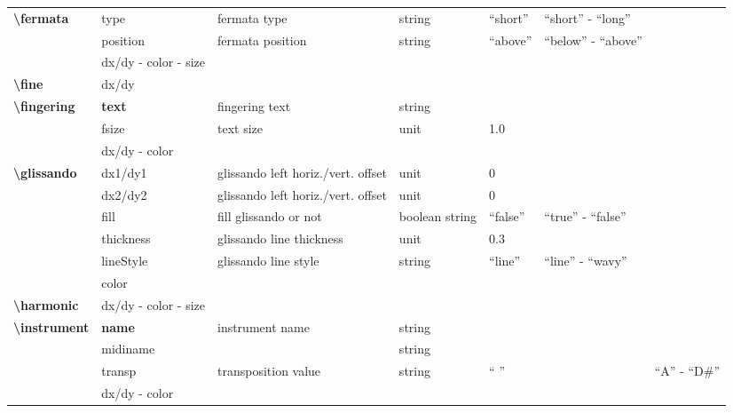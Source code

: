 \documentclass[a4paper, landscape, 10pt]{article}
\begin{document}
\begin{tabularx}{\linewidth}{p{3cm}p{3cm}p{5cm}p{3cm}p{2.5cm}p{3.5cm}p{4cm}}
    \textbf{\textbackslash{}fermata}&type&fermata type&string&``short''&``short'' - ``long''&\\
    &position&fermata position&string&``above''&``below'' - ``above''&\\
    &dx/dy - color - size&&&&&\\
    \hline
    \textbf{\textbackslash{}fine}&dx/dy&&&&&\\
    \hline
    \textbf{\textbackslash{}fingering}&\textbf{text}&fingering text&string&&&\\
    &fsize&text size&unit&1.0&&\\
    &dx/dy - color&&&&&\\
    \hline
    \textbf{\textbackslash{}glissando}&dx1/dy1&glissando left horiz./vert. offset&unit&0&&\\
    &dx2/dy2&glissando left horiz./vert. offset&unit&0&&\\
    &fill&fill glissando or not&boolean string&``false''&``true'' - ``false''&\\
    &thickness&glissando line thickness&unit&0.3&&\\
    &lineStyle&glissando line style&string&``line''&``line'' - ``wavy''&\\ %
    &color&&&&&\\
    \hline
	\textbf{\textbackslash{}harmonic}&dx/dy - color - size&&&&&\\
	\hline
    \textbf{\textbackslash{}instrument}&\textbf{name}&instrument name&string&&&\\
    &midiname&&string&&&\\ %
    &transp&transposition value&string&`` ''&&``A'' - ``D\#''\\
    &dx/dy - color&&&&&\\
    \hline
\end{tabularx}
\end{document}

